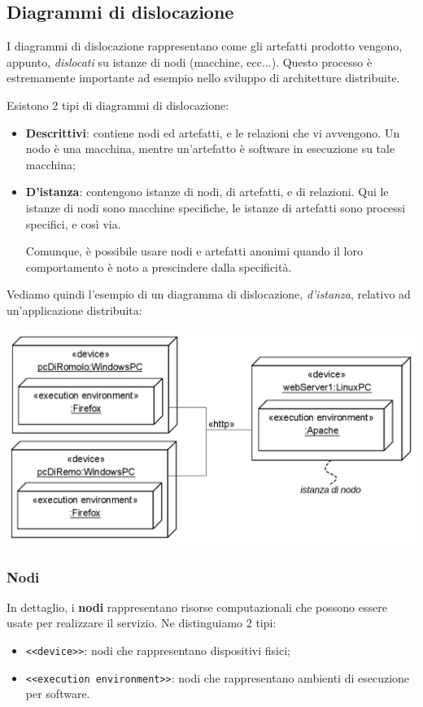 \documentclass[a4paper,11pt]{article}
\begin{document}
\subsection{Diagrammi di dislocazione}
I diagrammi di dislocazione rappresentano come gli artefatti prodotto vengono, appunto, \textit{dislocati} su istanze di nodi (macchine, ecc...).
Questo processo è estremamente importante ad esempio nello sviluppo di architetture distribuite.

Esistono 2 tipi di diagrammi di dislocazione:
\begin{itemize}
	\item \textbf{Descrittivi}: contiene nodi ed artefatti, e le relazioni che vi avvengono. Un nodo è una macchina, mentre un'artefatto è software in esecuzione su tale macchina; 
	\item \textbf{D'istanza}: contengono istanze di nodi, di artefatti, e di relazioni. Qui le istanze di nodi sono macchine specifiche, le istanze di artefatti sono processi specifici, e così via. 

		Comunque, è possibile usare nodi e artefatti anonimi quando il loro comportamento è noto a prescindere dalla specificità. 
\end{itemize}

Vediamo quindi l'esempio di un diagramma di dislocazione, \textit{d'istanza}, relativo ad un'applicazione distribuita:
\begin{center}
	\includegraphics[scale=0.3]{../figures/dislocazione.png}
\end{center}

\subsubsection{Nodi}
In dettaglio, i \textbf{nodi} rappresentano risorse computazionali che possono essere usate per realizzare il servizio. Ne distinguiamo 2 tipi:
\begin{itemize}
	\item \lstinline|<<device>>|: nodi che rappresentano dispositivi fisici;
	\item \lstinline|<<execution environment>>|: nodi che rappresentano ambienti di esecuzione per software.
\end{itemize}
\end{document}
